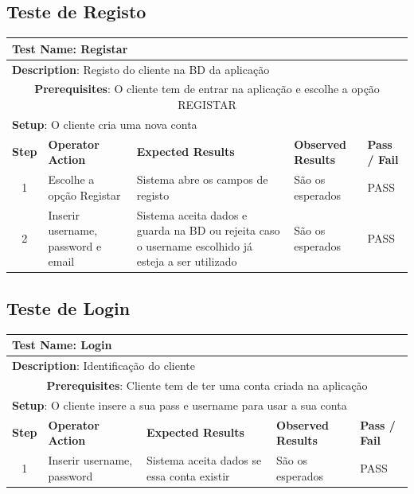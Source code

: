 \documentclass[12pt]{article} %
\begin{document}
\subsection{Teste de Registo}
\begin{table}[ht!]
	\begin{tabular}{|c|p{4cm}|p{4cm}|p{3cm}|p{1cm}|}
		\hline
		\multicolumn{5}{|l|}{\textbf{Test Name}: Registar}\\
		\hline
		\multicolumn{5}{|l|}{\textbf{Description}: Registo do cliente na BD da aplicação}\\
		\hline
		\multicolumn{5}{|p{14,5cm}|}{\textbf{Prerequisites}: O cliente tem de entrar na aplicação e escolhe a opção REGISTAR}\\
		\hline
		\multicolumn{5}{|l|}{\textbf{Setup}: O cliente cria uma nova conta}\\
		\hline
		\textbf{Step} & \textbf{Operator Action} & \textbf{Expected Results} & \textbf{Observed Results} & \textbf{Pass / Fail}\\
		\hline
		1 & Escolhe a opção Registar & Sistema abre os campos de registo & São os esperados & PASS\\
		\hline
		2 & Inserir username, password e email & Sistema aceita dados e guarda na BD ou rejeita caso o username escolhido já esteja a ser utilizado & São os esperados & PASS\\
		\hline
	\end{tabular}
\end{table}
\pagebreak


\subsection{Teste de Login}
\begin{table}[ht!]
	\begin{tabular}{|c|p{4cm}|p{4cm}|p{3cm}|p{1cm}|}
		\hline
		\multicolumn{5}{|l|}{\textbf{Test Name}: Login}\\
		\hline
		\multicolumn{5}{|l|}{\textbf{Description}: Identificação do cliente}\\
		\hline
		\multicolumn{5}{|p{14,5cm}|}{\textbf{Prerequisites}: Cliente tem de ter uma conta criada na aplicação}\\
		\hline
		\multicolumn{5}{|l|}{\textbf{Setup}: O cliente insere a sua pass e username para usar a sua conta}\\
		\hline
		\textbf{Step} & \textbf{Operator Action} & \textbf{Expected Results} & \textbf{Observed Results} & \textbf{Pass / Fail}\\
		\hline
		1 & Inserir username, password & Sistema aceita dados se essa conta existir & São os esperados & PASS\\
		\hline
	\end{tabular}
\end{table}
\pagebreak
\end{document}
